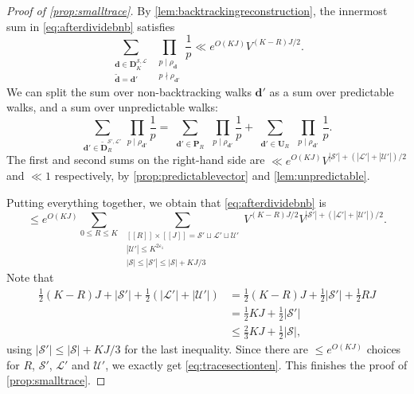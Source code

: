 \documentclass[11pt]{amsart}
\theoremstyle{definition}
\renewcommand{\leq}{\leqslant}
\newcommand{\sinterval}[1]{[\![#1]\!] }
\newcommand{\abs}[1]{\left|#1\right|}
\newcommand{\eps}{\varepsilon}
\renewcommand{\d}{\boldsymbol{d}}
\newcommand{\cstU}{2\eps_1}
\newcommand{\curlyL}{V}
\newcommand{\pred}{\mathbf{P}_{\!\tupsize}}
\newcommand{\unpred}{\mathbf{U}_{\!\tupsize}}
\newcommand{\fprod}[1]{\rho_{#1}}
\newcommand{\pall}{\fprod{\d}}
\newcommand{\pallprime}{\fprod{\d'}}
\newcommand{\lit}{\mathcal{L}}
\newcommand{\unlit}{\mathcal{U}}
\newcommand{\s}{\mathcal{S}}
\newcommand{\fancyD}{\mathbf{D}}
\newcommand{\Dss}{\fancyD^{\s,\lit}_{\!\repK}}
\newcommand{\Dnbb}{\widetilde{\fancyD}^{\s',\lit'}_{\!\tupsize}}
\newcommand{\repR}{J}
\newcommand{\repK}{K}
\newcommand{\newR}{\sinterval{J}}
\newcommand{\Redd}{\widetilde{\d}}
\newcommand{\tupsize}{R}
\begin{document}
\begin{proof}[Proof of \cref{prop:smalltrace}]
By \cref{lem:backtrackingreconstruction}, the innermost sum in \cref{eq:afterdividebnb} satisfies
\begin{equation*}
	\sum_{\substack{\d\in \Dss\\ \Redd = \d'}}\, \prod_{\substack{p\mid \pall \\ p\nmid \pallprime}} \frac{1}{p} \ll e^{O(\repK\repR)} \curlyL^{(\repK-\tupsize)\repR/2}.
\end{equation*}
We can split the sum over non-backtracking walks $\d'$ as a sum over predictable walks, and a sum over unpredictable walks:
\begin{equation*}
	\sum_{\d' \in \Dnbb} \, \prod_{p\mid \pallprime} \frac{1}{p} =  \sum_{\substack{\d' \in \pred}} \, \prod_{p\mid \pallprime} \frac{1}{p} + \sum_{\substack{\d'\in \unpred}}\,\prod_{p\mid \pallprime}\, \frac{1}{p}.
\end{equation*}
The first and second sums on the right-hand side are $\ll e^{O(\repK\repR)}\curlyL^{|\s'|+(\abs{\lit'}+\abs{\unlit'})/2}$ and $\ll 1$ respectively, by \cref{prop:predictablevector} and \cref{lem:unpredictable}.

Putting everything together, we obtain that \cref{eq:afterdividebnb} is
\begin{equation*}
	\leq e^{O(\repK\repR)}\sum_{0\leq \tupsize\leq \repK}\, \sum_{\substack{\sinterval{\tupsize}\times \newR = \s'\sqcup \lit'\sqcup \unlit'\\ \abs{\unlit'}\leq \repK^{\cstU}\\ |\s| \leq |\s'| \leq |\s| +\repK \repR/3}} \curlyL^{(\repK-\tupsize)\repR/2} \curlyL^{|\s'|+(\abs{\lit'}+\abs{\unlit'})/2}.
\end{equation*}
Note that
\begin{align*}
	\tfrac12 (\repK-\tupsize)\repR + |\s'| + \tfrac12 (\abs{\lit'}+\abs{\unlit'}) &=\tfrac12 (\repK-\tupsize)\repR + \tfrac12 |\s'| + \tfrac12\tupsize \repR\\
	&= \tfrac12 \repK\repR +  \tfrac12 |\s'|\\
	&\leq \tfrac23 \repK\repR + \tfrac12 |\s|,
\end{align*}
using $|\s'| \leq |\s| +\repK \repR/3$ for the last inequality. Since there are $\leq e^{O(\repK\repR)}$ choices for $\tupsize$, $\s'$, $\lit'$ and $\unlit'$, we exactly get \cref{eq:tracesectionten}. This finishes the proof of \cref{prop:smalltrace}.
\end{proof}
\end{document}
